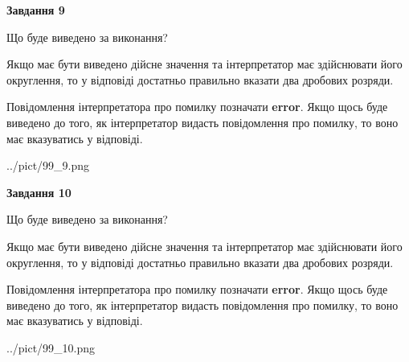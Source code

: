 \documentclass[12pt, ukrainian]{article}
\begin{document}
{\begin {Large}
{\begin {center}\textbf{Завдання 9}\end {center}}\par
Що буде виведено за виконання? \par

Якщо має бути виведено дійсне значення та інтерпретатор має здійснювати його округлення, 
то у відповіді достатньо правильно вказати два дробових розряди.

Повідомлення інтерпретатора про помилку позначати \textbf{error}.
Якщо щось буде виведено до того, як інтерпретатор видасть повідомлення про помилку, 
то воно має вказуватись у відповіді. \par

\begin{center}
	{../pict/99_9.png}
\end{center}
\newpage

{\begin {center}\textbf{Завдання 10}\end {center}}\par
Що буде виведено за виконання? \par

Якщо має бути виведено дійсне значення та інтерпретатор має здійснювати його округлення, 
то у відповіді достатньо правильно вказати два дробових розряди.

Повідомлення інтерпретатора про помилку позначати \textbf{error}.
Якщо щось буде виведено до того, як інтерпретатор видасть повідомлення про помилку, 
то воно має вказуватись у відповіді. \par

\begin{center}
	{../pict/99_10.png}
\end{center}
\newpage

\end {Large}}
\end{document}
